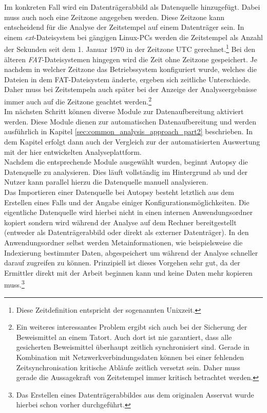 \noindent
Im konkreten Fall wird ein Datenträgerabbild als Datenquelle hinzugefügt. Dabei muss auch noch eine Zeitzone angegeben werden. Diese Zeitzone kann entscheidend für die Analyse der Zeitstempel auf einem Datenträger sein. In einem \textit{ext}-Dateisystem bei gängigen Linux-PCs werden die Zeitstempel als Anzahl der Sekunden seit dem 1. Januar 1970 in der Zeitzone UTC gerechnet.\cite[S. 326]{filesystem_forensic}\footnote{Diese Zeitdefinition entspricht der sogenannten Unixzeit.} Bei den älteren \textit{FAT}-Dateisystemen hingegen wird die Zeit ohne Zeitzone gespeichert.\cite[S. 192-194]{filesystem_forensic} Je nachdem in welcher Zeitzone das Betriebssystem konfiguriert wurde, welches die Dateien in dem FAT-Dateisystem änderte, ergeben sich zeitliche Unterschiede. Daher muss bei Zeitstempeln auch später bei der Anzeige der Analyseergebnisse immer auch auf die Zeitzone geachtet werden.\footnote{Ein weiteres interessantes Problem ergibt sich auch bei der Sicherung der Beweismittel an einem Tatort. Auch dort ist nie garantiert, dass alle gesicherten Beweismittel überhaupt zeitlich synchronisiert sind. Gerade in Kombination mit Netzwerkverbindungsdaten können bei einer fehlenden Zeitsynchronisation kritische Abläufe zeitlich versetzt sein. Daher muss gerade die Aussagekraft von Zeitstempel immer kritisch betrachtet werden.}\\

\noindent
Im nächsten Schritt können diverse Module zur Datenaufbereitung aktiviert werden. Diese Module dienen zur automatischen Datenaufbereitung und werden ausführlich in Kapitel \ref{sec:common_analysis_approach_part2} beschrieben. In dem Kapitel erfolgt dann auch der Vergleich zur der automatisierten Auswertung mit der hier entwickelten Analyseplattform.\\
Nachdem die entsprechende Module ausgewählt wurden, beginnt Autopsy die Datenquelle zu analysieren. Dies läuft vollständig im Hintergrund ab und der Nutzer kann parallel hierzu die Datenquelle manuell analysieren.\\ 

\noindent
Das Importieren einer Datenquelle bei Autopsy besteht letztlich aus dem Erstellen eines Falls und der Angabe einiger Konfigurationsmöglichkeiten. Die eigentliche Datenquelle wird hierbei nicht in einen internen Anwendungsordner kopiert sondern wird während der Analyse auf dem Rechner bereitgestellt (entweder als Datenträgerabbild oder direkt als externer Datenträger). In den Anwendungsordner selbst werden Metainformationen, wie beispielsweise die Indexierung bestimmter Daten, abgespeichert um während der Analyse schneller darauf zugreifen zu können. Prinzipiell ist dieses Vorgehen sehr gut, da der Ermittler direkt mit der Arbeit beginnen kann und keine Daten mehr kopieren muss.\footnote{Das Erstellen eines Datenträgerabbildes aus dem originalen Asservat wurde hierbei schon vorher durchgeführt.}


